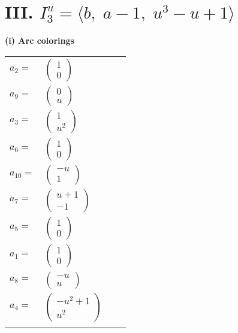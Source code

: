 \documentclass[1p]{elsarticle_modified}
\theoremstyle{definition}
\begin{document}
\centering \section*{III. $I^u_{3}= \langle b,\;a-1,\;u^3- u+1 \rangle$}
\flushleft \textbf{(i) Arc colorings}\\
\begin{tabular}{m{7pt} m{180pt} m{7pt} m{180pt} }
\flushright $a_{2}=$&$\begin{pmatrix}1\\0\end{pmatrix}$ \\
\flushright $a_{9}=$&$\begin{pmatrix}0\\u\end{pmatrix}$ \\
\flushright $a_{3}=$&$\begin{pmatrix}1\\u^2\end{pmatrix}$ \\
\flushright $a_{6}=$&$\begin{pmatrix}1\\0\end{pmatrix}$ \\
\flushright $a_{10}=$&$\begin{pmatrix}- u\\1\end{pmatrix}$ \\
\flushright $a_{7}=$&$\begin{pmatrix}u+1\\-1\end{pmatrix}$ \\
\flushright $a_{5}=$&$\begin{pmatrix}1\\0\end{pmatrix}$ \\
\flushright $a_{1}=$&$\begin{pmatrix}1\\0\end{pmatrix}$ \\
\flushright $a_{8}=$&$\begin{pmatrix}- u\\u\end{pmatrix}$ \\
\flushright $a_{4}=$&$\begin{pmatrix}- u^2+1\\u^2\end{pmatrix}$\\&\end{tabular}
\end{document}
